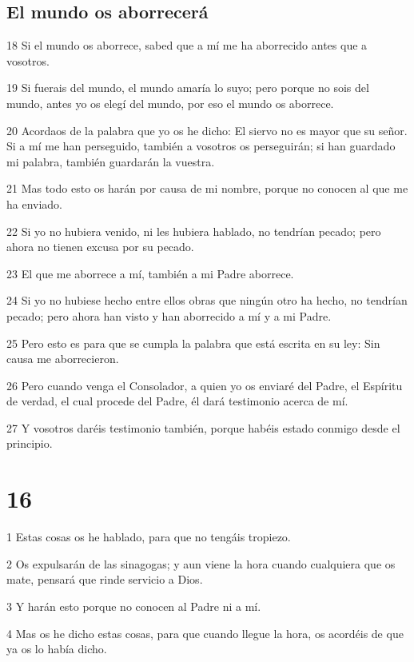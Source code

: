 \section*{El mundo os aborrecerá}

\par 18 Si el mundo os aborrece, sabed que a mí me ha aborrecido antes que a vosotros.
\par 19 Si fuerais del mundo, el mundo amaría lo suyo; pero porque no sois del mundo, antes yo os elegí del mundo, por eso el mundo os aborrece.
\par 20 Acordaos de la palabra que yo os he dicho: El siervo no es mayor que su señor. Si a mí me han perseguido, también a vosotros os perseguirán; si han guardado mi palabra, también guardarán la vuestra.
\par 21 Mas todo esto os harán por causa de mi nombre, porque no conocen al que me ha enviado.
\par 22 Si yo no hubiera venido, ni les hubiera hablado, no tendrían pecado; pero ahora no tienen excusa por su pecado.
\par 23 El que me aborrece a mí, también a mi Padre aborrece.
\par 24 Si yo no hubiese hecho entre ellos obras que ningún otro ha hecho, no tendrían pecado; pero ahora han visto y han aborrecido a mí y a mi Padre.
\par 25 Pero esto es para que se cumpla la palabra que está escrita en su ley: Sin causa me aborrecieron.
\par 26 Pero cuando venga el Consolador, a quien yo os enviaré del Padre, el Espíritu de verdad, el cual procede del Padre, él dará testimonio acerca de mí.
\par 27 Y vosotros daréis testimonio también, porque habéis estado conmigo desde el principio.

\chapter{16}

\par 1 Estas cosas os he hablado, para que no tengáis tropiezo.
\par 2 Os expulsarán de las sinagogas; y aun viene la hora cuando cualquiera que os mate, pensará que rinde servicio a Dios.
\par 3 Y harán esto porque no conocen al Padre ni a mí.
\par 4 Mas os he dicho estas cosas, para que cuando llegue la hora, os acordéis de que ya os lo había dicho.


